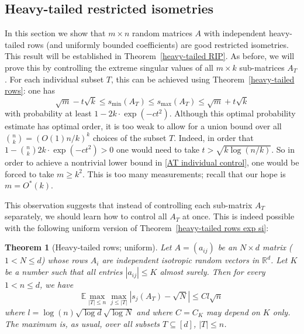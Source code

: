\documentclass[10pt, openany]{book}
\newtheorem{theorem}{Theorem}[chapter]
\theoremstyle{remark}
\def \R {\mathbb{R}}
\def \E {\mathbb{E}}
\def \smin {s_{\min}}
\def \smax {s_{\max}}
\begin{document}
\subsection{Heavy-tailed restricted isometries}	 		\label{s: heavy-tailed RIP}

In this section we show that $m \times n$ random matrices $A$ with independent 
heavy-tailed rows (and uniformly bounded coefficients) are good restricted isometries.
This result will be established in Theorem~\ref{heavy-tailed RIP}. 
As before, we will prove this by controlling the extreme singular values of 
all $m \times k$ sub-matrices $A_T$. For each individual subset $T$, this can be achieved 
using Theorem~\ref{heavy-tailed rows}:
one has 
\begin{equation}										\label{AT individual control}
\sqrt{m} - t \sqrt{k} \le \smin(A_T) \le \smax(A_T) \le \sqrt{m} + t \sqrt{k}
\end{equation}
with probability at least $1 - 2 k \cdot \exp(-ct^2)$.
Although this optimal probability estimate has optimal order, it is too weak to allow for
a union bound over all $\binom{n}{k} = (O(1) n/k)^k$ choices of the subset $T$. 
Indeed, in order that $1 - \binom{n}{k} 2 k \cdot \exp(-ct^2) > 0$ 
one would need to take $t > \sqrt{k \log(n/k)}$. So in order to achieve a nontrivial 
lower bound in \eqref{AT individual control}, one would be forced to take $m \ge k^2$. 
This is too many measurements; recall that our hope is $m = O^*(k)$.

This observation suggests that instead of controlling each sub-matrix $A_T$ separately, 
we should learn how to control all $A_T$ at once. 
This is indeed possible with the following uniform version 
of Theorem~\ref{heavy-tailed rows exp si}:

\begin{theorem}[Heavy-tailed rows; uniform]					\label{heavy-tailed rows uniform}
  Let $A=(a_{ij})$ be an $N \times d$ matrix ($1 < N \le d$) whose rows $A_i$ are independent
  isotropic random vectors in $\R^d$. Let $K$ be a number such that
  all entries $|a_{ij}| \le K$ almost surely.
  Then for every $1 < n \le d$, we have
  $$
  \E \max_{|T| \le n} \max_{j \le |T|} |s_j(A_T) - \sqrt{N}|
  \le C l \sqrt{n}
  $$
  where $l = \log(n) \sqrt{\log d} \sqrt{\log N}$
  and where $C=C_K$ may depend on $K$ only.
  The maximum is, as usual, over all subsets $T \subseteq [d]$, $|T| \le n$.
\end{theorem}
\end{document}
